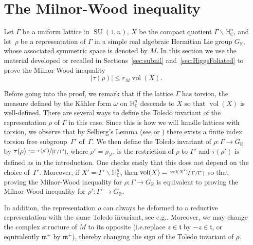 \documentclass[10pt]{amsart}
\newcommand{\citestar}[3]{\cite[#3]{#1}}
\theoremstyle{plain}
\theoremstyle{definition}
\DeclareMathOperator{\SU}{SU}
\DeclareMathOperator{\vol}{vol}
\newcommand{\bR}{\mathbb{R}}
\newcommand{\HC}{{\mathbb{H}^n_\mathbb{C}}}
\newcommand{\fm}{\mathfrak{m}}
\newcommand{\ft}{\mathfrak{t}}
\newcommand{\rkm}{{r_M}}
\providecommand{\eg}{e.g.}\providecommand{\ie}{i.e.}\providecommand{\etc}{etc.}\providecommand{\resp}{resp.}\providecommand{\cf}{cf.}
\begin{document}
\vspace*{-\baselineskip}\vskip0pt
\section{The Milnor-Wood inequality}
\label{sec:MW}

Let $\Gamma$ be a uniform lattice in $\SU(1,n)$, $X$ be the compact quotient $\Gamma\backslash\HC$, and let~$\rho$
be a representation of $\Gamma$ in a simple real algebraic Hermitian Lie group $G_\bR$, whose associated
symmetric space is denoted by $M$. In this section we use
the material developed or recalled in Sections~\ref{sec:subnil} and~\ref{sec:HiggsFoliated}
to prove the Milnor-Wood inequality
$$
|\tau(\rho)|\leq \rkm\vol(X).
$$

Before going into the proof, we remark that if the lattice $\Gamma$ has torsion, the measure defined by
the Kähler form $\omega$ on $\HC$ descends to $X$ so that $\vol(X)$ is well-defined.
There are several ways to define the Toledo invariant of the representation $\rho$ of $\Gamma$ in
this case. Since this is how we will handle lattices with torsion, we observe that by
Selberg's Lemma (see \citestar{ratcliffe}*{p.\,327} or \cite{selberg}) there exists a finite index
torsion free subgroup~$\Gamma'$ of~$\Gamma$. We then define the Toledo invariant of $\rho:\Gamma\to
G_\bR$ by \hbox{$\tau(\rho):= \sfrac{\tau(\rho')}{|\Gamma/\Gamma'|}$}, where $\rho'=\rho_{|\Gamma'}$ is the restriction of $\rho$ to
$\Gamma'$ and $\tau(\rho')$ is defined as in the introduction. One checks easily that this does not depend
on the choice of~$\Gamma'$. Moreover, if
$X'=\Gamma'\backslash\HC$, then $\vol(X)=\sfrac{\vol(X')}{|\Gamma/\Gamma'|}$ so that proving the Milnor-Wood
inequality for $\rho:\Gamma\to G_\bR$ is equivalent to proving the Milnor-Wood inequality for $\rho':\Gamma'\to
G_\bR$.

In addition, the representation $\rho$ can always be deformed to a
reductive representation with the same Toledo invariant, see \eg \citestar{KM}*{Lem.\,4.11}. Moreover,
we may change the complex structure of $M$ to its opposite (\ie replace $z\in\ft$ by $-z\in\ft$, or
equivalently $\fm^\pm$ by $\fm^{\mp}$), thereby changing the sign of the Toledo
invariant of $\rho$.
\end{document}
